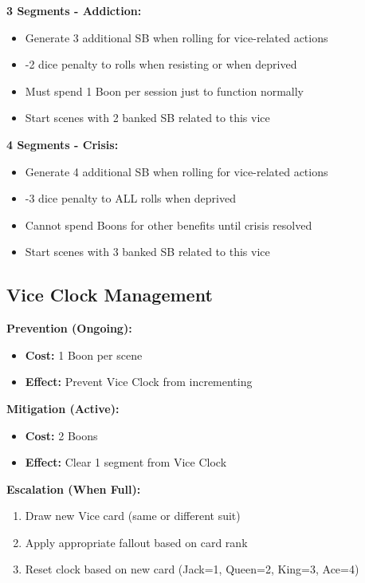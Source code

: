 \documentclass[11pt]{article}
\begin{document}
\textbf{3 Segments - Addiction:}
\begin{itemize}
    \item Generate 3 additional SB when rolling for vice-related actions
    \item -2 dice penalty to rolls when resisting or when deprived
    \item Must spend 1 Boon per session just to function normally
    \item Start scenes with 2 banked SB related to this vice
\end{itemize}

\textbf{4 Segments - Crisis:}
\begin{itemize}
    \item Generate 4 additional SB when rolling for vice-related actions
    \item -3 dice penalty to ALL rolls when deprived
    \item Cannot spend Boons for other benefits until crisis resolved
    \item Start scenes with 3 banked SB related to this vice
\end{itemize}

\subsection{Vice Clock Management}

\textbf{Prevention (Ongoing):}
\begin{itemize}
    \item \textbf{Cost:} 1 Boon per scene
    \item \textbf{Effect:} Prevent Vice Clock from incrementing
\end{itemize}

\textbf{Mitigation (Active):}
\begin{itemize}
    \item \textbf{Cost:} 2 Boons
    \item \textbf{Effect:} Clear 1 segment from Vice Clock
\end{itemize}

\textbf{Escalation (When Full):}
\begin{enumerate}
    \item Draw new Vice card (same or different suit)
    \item Apply appropriate fallout based on card rank
    \item Reset clock based on new card (Jack=1, Queen=2, King=3, Ace=4)
\end{enumerate}
\end{document}
